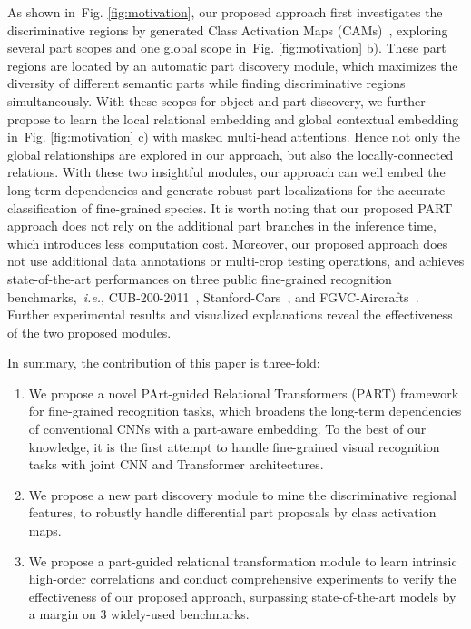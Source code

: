 \documentclass[journal]{IEEEtran}
\def\ie{{\em i.e.}}
\newcommand{\figref}[1]{Fig. \ref{#1}}
\begin{document}
As shown in~\figref{fig:motivation}, our proposed approach first investigates the discriminative regions by generated Class Activation Maps (CAMs)~\cite{zhou2016learning}, exploring several part scopes and one global scope in~\figref{fig:motivation} b). These part regions are located by an automatic part discovery module, which maximizes the diversity of different semantic parts while finding discriminative regions simultaneously. With these scopes for object and part discovery, we further propose to learn the local relational embedding and global contextual embedding in~\figref{fig:motivation} c) with masked multi-head attentions. Hence not only the global relationships are explored in our approach, but also the locally-connected relations. With these two insightful modules, our approach can well embed the long-term dependencies and generate robust part localizations for the accurate classification of fine-grained species. It is worth noting that our proposed PART approach does not rely on the additional part branches in the inference time, which introduces less computation cost. Moreover, our proposed approach does not use additional data annotations or multi-crop testing operations, and achieves state-of-the-art performances on three public fine-grained recognition benchmarks,~\ie, CUB-200-2011~\cite{wah2011caltech}, Stanford-Cars~\cite{krause20133d}, and FGVC-Aircrafts~\cite{maji2013fine}. Further experimental results and visualized explanations reveal the effectiveness of the two proposed modules.

In summary, the contribution of this paper is three-fold:
\begin{enumerate}
\item We propose a novel PArt-guided Relational Transformers (PART) framework for fine-grained recognition tasks, which broadens the long-term dependencies of conventional CNNs with a part-aware embedding. To the best of our knowledge, it is the first attempt to handle fine-grained visual recognition tasks with joint CNN and Transformer architectures.
\item We propose a new part discovery module to mine the discriminative regional features, to robustly handle differential part proposals by class activation maps.
\item We propose a part-guided relational transformation module to learn intrinsic high-order correlations and conduct comprehensive experiments to verify the effectiveness of our proposed approach, surpassing state-of-the-art models by a margin on 3 widely-used benchmarks.
\end{enumerate}
\end{document}
